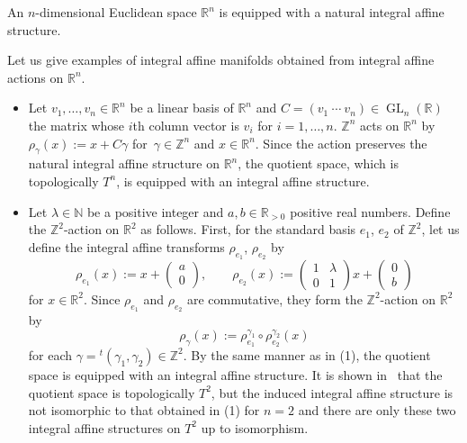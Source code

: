 \documentclass[10pt,a4paper]{amsart}
\numberwithin{equation}{section}
\newcommand{\R}{\mathbb{R}}
\newcommand{\Z}{\mathbb{Z}}
\newcommand{\N}{\mathbb{N}}
\def\GL{\operatorname{GL}}
\begin{document}
\begin{Example}\label{affine Euclidean}
An $n$-dimensional Euclidean space $\R^n$ is equipped with a natural integral affine structure.
\end{Example}

Let us give examples of integral affine manifolds obtained from integral affine actions on $\R^n$.
\begin{Example}\label{affine torus}\qquad
\begin{itemize}\itemsep=0pt
\item[(1)] Let $v_1,\ldots ,v_n\in \R^n$ be a linear basis of $\R^n$ and $C=(v_1\ \cdots\ v_n)\in \GL_n(\R)$ the matrix whose $i$th column vector is $v_i$ for $i=1,\ldots , n$. $\Z^n$ acts on $\R^n$ by $\rho_\gamma (x):=x+C\gamma$
for~${\gamma\in \Z^n}$ and $x\in \R^n$. Since the action preserves the natural integral affine structure on $\R^n$, the quotient space, which is topologically $T^n$, is equipped with an integral affine structure.
\item[(2)] Let $\lambda\in \N$ be a positive integer and $a, b\in \R_{>0}$ positive real numbers. Define the $\Z^2$-action on $\R^2$ as follows. First, for the standard basis $e_1$, $e_2$ of $\Z^2$, let us define the integral affine transforms $\rho_{e_1}$, $\rho_{e_2}$ by
\[
\rho_{e_1}(x):=x+
\begin{pmatrix}
a \\
0
\end{pmatrix},\qquad
\rho_{e_2}(x):=
\begin{pmatrix}
1 & \lambda \\
0 & 1
\end{pmatrix}
x+
\begin{pmatrix}
0 \\
b
\end{pmatrix}
\]
for $x\in \R^2$. Since $\rho_{e_1}$ and $\rho_{e_2}$ are commutative, they form the $\Z^2$-action on $\R^2$ by
\[
\rho_\gamma (x):=\rho_{e_1}^{\gamma_1}\circ \rho_{e_2}^{\gamma_2}(x)
\]
for each $\gamma={}^t(\gamma_1,\gamma_2)\in \Z^2$. By the same manner as in (1),
the quotient space is equipped with an integral affine structure. It is shown in~\cite[Theorem A]{Mis} that the quotient space is topologically $T^2$, but the induced integral affine structure is not isomorphic to that obtained in (1) for $n=2$ and there are only these two integral affine structures on $T^2$ up to isomorphism.
\end{itemize}
\end{Example}
\end{document}
